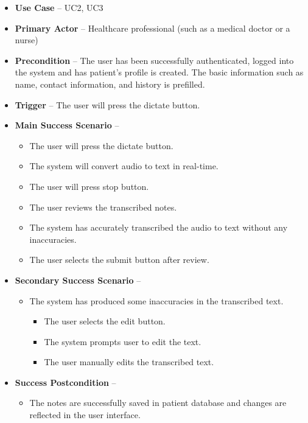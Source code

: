 \documentclass[12pt]{article}
\begin{document}
\begin{itemize}
  \item\textbf{Use Case} -- UC2, UC3
  \item\textbf{Primary Actor} -- Healthcare professional (such as a medical doctor or a nurse)
  \item\textbf{Precondition} -- The user has been successfully authenticated, logged into the system and has patient’s profile is created. The basic information such as name, contact information, and history is prefilled.
  \item\textbf{Trigger} -- The user will press the dictate button.
  \item\textbf{Main Success Scenario} --
  \begin{itemize}
    \item The user will press the dictate button.
    \item The system will convert audio to text in real-time.
    \item The user will press stop button.
    \item The user reviews the transcribed notes. 
    \item The system has accurately transcribed the audio to text without any inaccuracies.
    \item The user selects the submit button after review. 
  \end{itemize}
  \item\textbf{Secondary Success Scenario} --
  \begin{itemize}[label=5.\arabic*]
    \item The system has produced some inaccuracies in the transcribed text.
    \begin{itemize}[label=5.1\arabic*]
      \item The user selects the edit button.
      \item The system prompts user to edit the text.
      \item The user manually edits the transcribed text.
    \end{itemize} 
  \end{itemize}
  \item\textbf{Success Postcondition} --
  \begin{itemize}
    \item The notes are successfully saved in patient database and changes are reflected in the user interface.
  \end{itemize}
\end{itemize}
\end{document}
